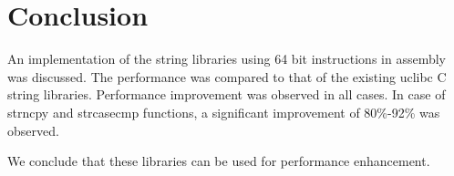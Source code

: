 \documentclass[12pt]{article}
\begin{document}
\newpage

\section{Conclusion}
An implementation of the string libraries using 64 bit instructions in assembly was discussed. The performance was compared to that of the existing uclibc C string libraries.
\newline
Performance improvement was observed in all cases. In case of strncpy and strcasecmp functions, a 
significant improvement of 80\%-92\% was observed.
\newline

We conclude that these libraries can be used for performance enhancement.

 
\end{document}
